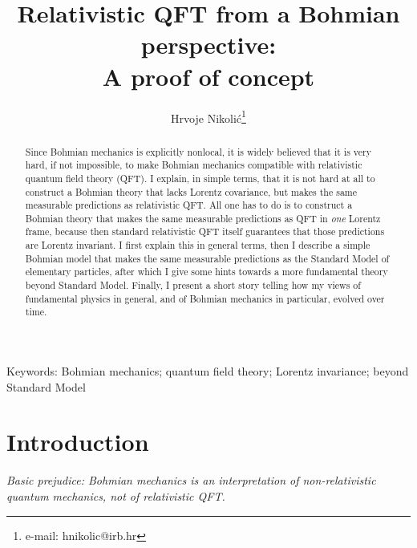 \documentclass[12pt]{article}
\title{Relativistic QFT from a Bohmian perspective: \\
A proof of concept}
\author{Hrvoje Nikoli\'c\footnote{e-mail: hnikolic@irb.hr}}
\affil{Theoretical Physics Division, Rudjer Bo\v{s}kovi\'{c} Institute, \\
P.O.B. 180, HR-10002 Zagreb, Croatia}
\begin{document}
\maketitle


\begin{abstract} 
Since Bohmian mechanics is explicitly nonlocal, it is widely believed that it is very hard,  
if not impossible, to make Bohmian mechanics compatible with relativistic quantum field theory (QFT).
I explain, in simple terms, that it is not hard at all to construct a Bohmian theory 
that lacks Lorentz covariance, but makes the same measurable predictions as relativistic QFT.
All one has to do is to construct a Bohmian theory 
that makes the same measurable predictions as QFT in {\em one} Lorentz frame,
because then standard relativistic QFT itself guarantees that those predictions are Lorentz invariant.
I first explain this in general terms, then I describe a simple Bohmian model that makes the same
measurable predictions as the Standard Model of elementary particles, after which I give some hints 
towards a more fundamental theory beyond Standard Model. 
Finally, I present a short story telling how my views of fundamental physics
in general, and of Bohmian mechanics in particular, evolved over time.      
\end{abstract}

\noindent
Keywords: Bohmian mechanics; quantum field theory; Lorentz invariance; beyond Standard Model

\section{Introduction}

\begin{flushright}
{\it Basic prejudice: Bohmian mechanics is an interpretation of non-relativistic quantum mechanics, not of relativistic QFT.}
\end{flushright}
\end{document}

